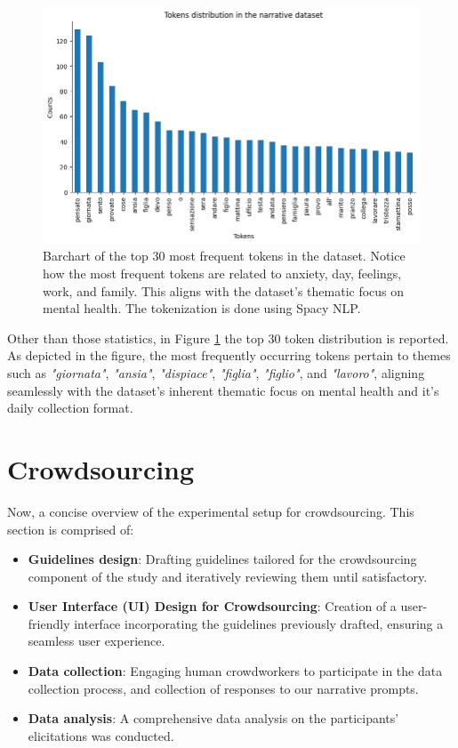 \begin{figure}[!htbp]
    \centering
    \includegraphics[width=1\linewidth]{assets//imgs/dataset-top-30-prompt.png}
    \caption{Barchart of the top 30 most frequent tokens in the dataset. Notice how the most frequent tokens are related to anxiety, day, feelings, work, and family. This aligns with the dataset's thematic focus on mental health. The tokenization is done using Spacy NLP.}
    \label{fig:dataset-top-30-prompt}
\end{figure}

Other than those statistics, in Figure \ref{fig:dataset-top-30-prompt} the top 30 token distribution is reported. As depicted in the figure, the most frequently occurring tokens pertain to themes such as  \emph{"giornata"}, \emph{"ansia"},  \emph{"dispiace"},  \emph{"figlia"},  \emph{"figlio"}, and  \emph{"lavoro"}, aligning seamlessly with the dataset's inherent thematic focus on mental health and it's daily collection format.

\section{Crowdsourcing}
Now, a concise overview of the experimental setup for crowdsourcing. This section is comprised of:
\begin{itemize}
    \item \textbf{Guidelines design}: Drafting guidelines tailored for the crowdsourcing component of the study and iteratively reviewing them until satisfactory.
    \item \textbf{User Interface (UI) Design for Crowdsourcing}: Creation of a user-friendly interface incorporating the guidelines previously drafted, ensuring a seamless user experience.
    \item \textbf{Data collection}: Engaging human crowdworkers to participate in the data collection process, and collection of responses to our narrative prompts.
    \item \textbf{Data analysis}: A comprehensive data analysis on the participants' elicitations was conducted.
\end{itemize}
